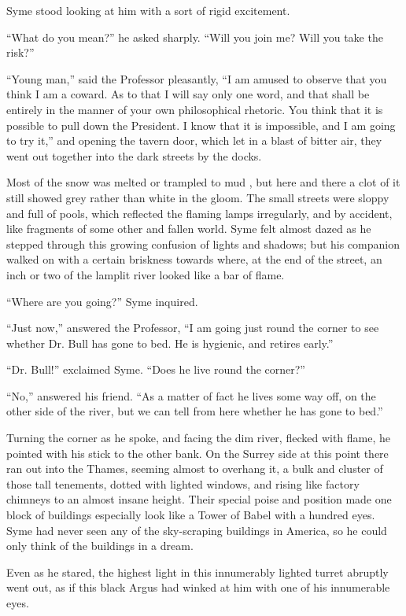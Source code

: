 \documentclass{book}
\begin{document}
Syme stood looking at him with a sort of rigid excitement.

“What do you mean?” he asked sharply. “Will you join me? Will you take the risk?”

“Young man,” said the Professor pleasantly, “I am amused to observe that you think I am a coward. As to that I will say only one word, and that shall be entirely in the manner of your own philosophical rhetoric. You think that it is possible to pull down the President. I know that it is impossible, and I am going to try it,” and opening the tavern door, which let in a blast of bitter air, they went out together into the dark streets by the docks.

Most of the snow was melted or trampled to mud , but here and there a clot of it still showed grey rather than white in the gloom. The small streets were sloppy and full of pools, which reflected the flaming lamps irregularly, and by accident, like fragments of some other and fallen world. Syme felt almost dazed as he stepped through this growing confusion of lights and shadows; but his companion walked on with a certain briskness towards where, at the end of the street, an inch or two of the lamplit river looked like a bar of flame.

“Where are you going?” Syme inquired.

“Just now,” answered the Professor, “I am going just round the corner to see whether Dr. Bull has gone to bed. He is hygienic, and retires early.”

“Dr. Bull!” exclaimed Syme. “Does he live round the corner?”

“No,” answered his friend. “As a matter of fact he lives some way off, on the other side of the river, but we can tell from here whether he has gone to bed.”

Turning the corner as he spoke, and facing the dim river, flecked with flame, he pointed with his stick to the other bank. On the Surrey side at this point there ran out into the Thames, seeming almost to overhang it, a bulk and cluster of those tall tenements, dotted with lighted windows, and rising like factory chimneys to an almost insane height. Their special poise and position made one block of buildings especially look like a Tower of Babel with a hundred eyes. Syme had never seen any of the sky-scraping buildings in America, so he could only think of the buildings in a dream.

Even as he stared, the highest light in this innumerably lighted turret abruptly went out, as if this black Argus had winked at him with one of his innumerable eyes.
\end{document}
